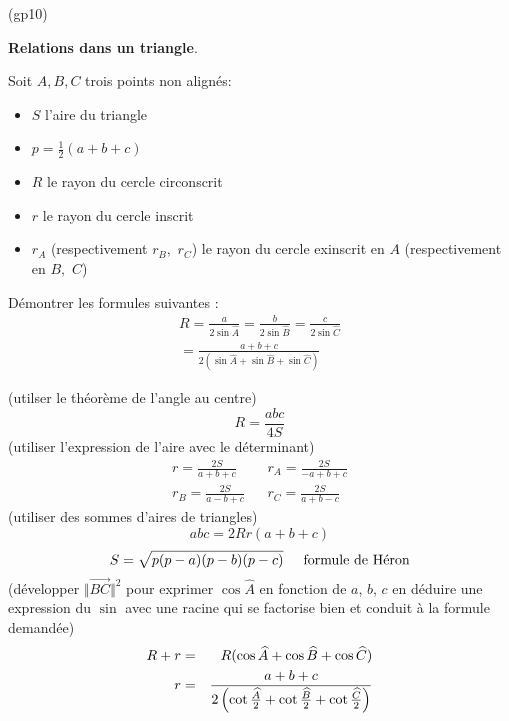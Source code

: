\begin{tiny}(gp10)\end{tiny}
 \textbf{Relations dans un triangle}.

Soit $A,B,C$ trois points non align{\'e}s:
\begin{itemize}
\item  $S$ l'aire du triangle
\item  $p=\frac{1}{2}(a+b+c)$
\item  $R$ le rayon du cercle circonscrit
\item  $r$ le rayon du cercle inscrit
\item  $r_{A}$ (respectivement $r_{B},$ $r_{C}$) le rayon du cercle
exinscrit en $A$ (respectivement en $B,$ $C$)
\end{itemize}
D{\'e}montrer les formules suivantes :
\begin{multline*}
 R = \frac{a}{2\sin \widehat{A}}=\frac{b}{2\sin \widehat{B}} =\frac{c}{2\sin\widehat{C}} \\
=\frac{a+b+c}{2(\sin \widehat{A}+\sin \widehat{B}+\sin \widehat{C})}
\end{multline*}

(utilser le théorème de l'angle au centre)
\begin{displaymath}
R =\frac{abc}{4S} 
\end{displaymath}
(utiliser l'expression de l'aire avec le déterminant)
\begin{align*}
 r=\frac{2S}{a+b+c} & & r_{A} =\frac{2S}{-a+b+c}\\
r_{B} = \frac{2S}{a-b+c} & & r_{C} = \frac{2S}{a+b-c}
\end{align*}
(utiliser des sommes d'aires de triangles)
\begin{displaymath}
abc = 2Rr(a+b+c) 
\end{displaymath}
\begin{displaymath}
S = \sqrt{p(p-a)(p-b)(p-c)}\hspace{0.5cm}\text{formule de Héron} 
\end{displaymath}
(développer $\Vert \overrightarrow{BC}\Vert^2$ pour exprimer $\cos \widehat A$ en fonction de $a$, $b$, $c$ en déduire une expression du $\sin$ avec une racine qui se factorise bien et conduit à la formule demandée)
\begin{align*}
R+r &=&R(\cos \widehat{A}+\cos \widehat{B}+\cos \widehat{C}) \\
r &=&\frac{a+b+c}{2\left( \cot \frac{\widehat {A}}{2}+\cot \frac{%
\widehat {B}}{2}+\cot \frac{\widehat {C}}{2}\right) }
\end{align*}
